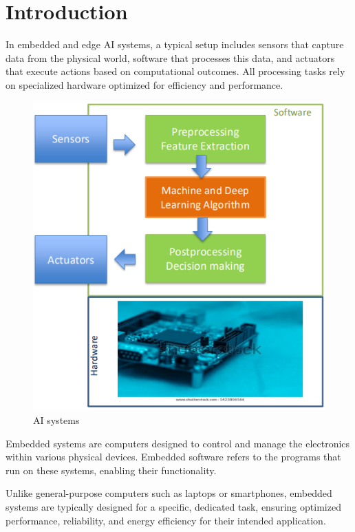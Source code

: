 \section{Introduction}

In embedded and edge AI systems, a typical setup includes sensors that capture data from the physical world, software that processes this data, and actuators that execute actions based on computational outcomes. 
All processing tasks rely on specialized hardware optimized for efficiency and performance.

\begin{figure}[H]
    \centering
    \includegraphics[width=0.5\linewidth]{images/eeai3.png}
    \caption{AI systems}
\end{figure}

Embedded systems are computers designed to control and manage the electronics within various physical devices. 
Embedded software refers to the programs that run on these systems, enabling their functionality.

Unlike general-purpose computers such as laptops or smartphones, embedded systems are typically designed for a specific, dedicated task, ensuring optimized performance, reliability, and energy efficiency for their intended application.